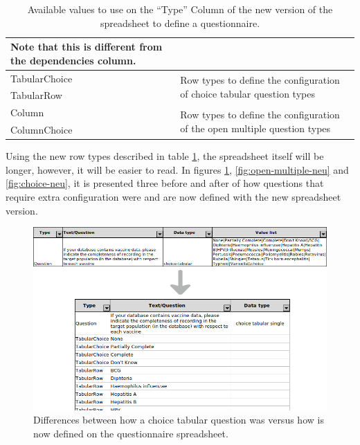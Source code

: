 \begin{table}[H]
\begin{tabular}{| p{.2\linewidth} | p{.8\linewidth} |}
        Note that this is different from the dependencies column. \\ \hline
TabularChoice                 & \multirow{2}{*}{Row types to define the configuration of choice tabular question types}    \\ \cline{1-1}
TabularRow                    &                                                                                            \\ \hline
Column                        & \multirow{2}{*}{Row types to define the configuration of the open multiple question types} \\ \cline{1-1}
ColumnChoice                  &                                                                                            \\ \hline
\end{tabular}
\caption{Available values to use on the ``Type'' Column of the new version of the spreadsheet to define a questionnaire.}
\label{tab:excel-row-types}
\end{table}

Using the new row types described in table \ref{tab:excel-row-types}, the spreadsheet itself will be longer, however, it will be easier to read.
In figures \ref{fig:choice-tabular-neu}, \ref{fig:open-multiple-neu} and \ref{fig:choice-neu}, it is presented three before and after of how questions that require extra configuration were and are now defined with the new spreadsheet version.

\begin{figure}[H]
    \center
    \includegraphics[width=.75\textwidth]{choice-tabular-neu}
    \caption{Differences between how a choice tabular question was versus how is now defined on the questionnaire spreadsheet.}
    \label{fig:choice-tabular-neu}
\end{figure}

